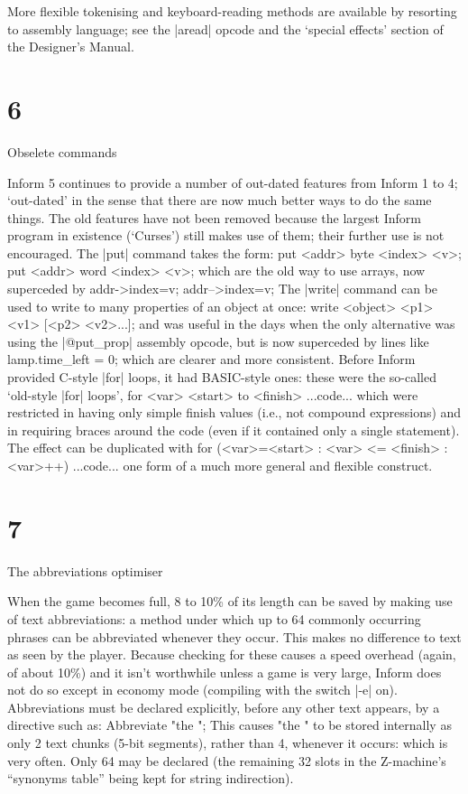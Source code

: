 \noindent More flexible tokenising and keyboard-reading methods are available
by resorting to assembly language; see the |aread| opcode and the
`special effects' section of the Designer's Manual.

\section{6}{Obselete commands}

Inform 5 continues to provide a number of out-dated features from Inform 1
to 4; `out-dated' in the sense that there are now much better ways to do
the same things.  The old features have not been removed because the
largest Inform program in existence (`Curses') still makes use of them;
their further use is not encouraged.
\medskip
The |put| command takes the form:
\beginstt
put <addr> byte <index> <v>;
put <addr> word <index> <v>;
\endtt
which are the old way to use arrays, now superceded by
\beginstt
addr->index=v;
addr-->index=v;
\endtt
\medskip
The |write| command can be used to write to many properties of an object
at once:
\beginstt
write <object> <p1> <v1> [<p2> <v2>...];
\endtt
and was useful in the days when the only alternative was using the
|@put_prop| assembly opcode, but is now superceded by lines like
\beginstt
lamp.time_left = 0;
\endtt
which are clearer and more consistent.
\medskip
Before Inform provided C-style |for| loops, it had BASIC-style ones:
these were the so-called `old-style |for| loops',
\beginstt
for <var> <start> to <finish> { ...code... }
\endtt
which were restricted in having only simple finish values (i.e., not
compound expressions) and in requiring braces around the code (even
if it contained only a single statement).  The effect can be duplicated
with
\beginstt
for (<var>=<start> : <var> <= <finish> : <var>++) ...code...
\endtt
one form of a much more general and flexible construct.

\section{7}{The abbreviations optimiser}

When the game becomes full, 8 to 10\% of its length can be saved by making
use of text abbreviations: a method under which up to 64 commonly occurring
phrases can be abbreviated whenever they occur.  This makes no difference
to text as seen by the player.  Because checking for these causes a speed
overhead (again, of about 10\%) and it isn't worthwhile unless a game is
very large, Inform does not do so except in economy mode (compiling with
the switch |-e| on).  Abbreviations must be declared explicitly, before
any other text appears, by a directive such as:
\beginstt
Abbreviate "the ";
\endtt
This causes "the " to be stored internally as only 2 text chunks (5-bit
segments), rather than 4, whenever it occurs: which is very often.
Only 64 may be declared (the remaining 32 slots in the Z-machine's
``synonyms table'' being kept for string indirection).


